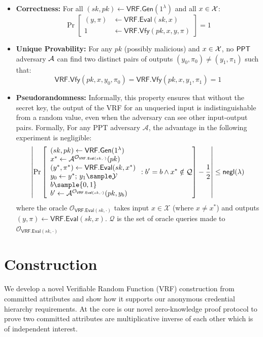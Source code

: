 \begin{itemize}
    \item \textbf{Correctness:} For all $(sk, pk) \gets \mathsf{VRF.Gen}(1^\lambda)$ and all $x \in \mathcal{X}$:
    \[
    \Pr\left[\begin{aligned}
        (y, \pi) &\gets \mathsf{VRF.Eval}(sk, x) \\
        1 &\gets \mathsf{VRF.Vfy}(pk, x, y, \pi)
    \end{aligned}\right] = 1
    \]

    \item \textbf{Unique Provability:} For any $pk$ (possibly malicious) and $x \in \mathcal{X}$, no $\mathsf{PPT}$ adversary $\mathcal{A}$ can find two distinct pairs of outputs $(y_0, \pi_0) \neq (y_1, \pi_1)$ such that:
    \[
    \mathsf{VRF.Vfy}(pk, x, y_0, \pi_0) = \mathsf{VRF.Vfy}(pk, x, y_1, \pi_1) = 1
    \]

    \item \textbf{Pseudorandomness:} Informally, this property ensures that without the secret key, the output of the VRF for an unqueried input is indistinguishable from a random value, even when the adversary can see other input-output pairs.
    Formally, For any PPT adversary $\mathcal{A}$, the advantage in the following experiment is negligible:
    \[
    \left|\Pr\left[\begin{array}{l}
        (sk, pk) \gets \mathsf{VRF.Gen}(1^\lambda) \\
        x^* \gets \mathcal{A}^{\mathcal{O}_{\mathsf{VRF.Eval}(sk, \cdot)}}(pk) \\
        (y^*, \pi^*) \gets \mathsf{VRF.Eval}(sk, x^*) \\
        y_0 \gets y^*; \, y_1 \sample \mathcal{Y} \\
        b \sample \{0,1\} \\
        b' \gets \mathcal{A}^{\mathcal{O}_{\mathsf{VRF.Eval}(sk, \cdot)}}(pk, y_b)
    \end{array} : b' = b \wedge x^* \notin \mathcal{Q}\right] - \frac{1}{2}\right| \leq \negl(\lambda)
    \]
    where the oracle $\mathcal{O}_{\mathsf{VRF.Eval}(sk, \cdot)}$ takes input $x \in \mathcal{X}$ (where $x \neq x^*$) and outputs $(y, \pi) \gets \mathsf{VRF.Eval}(sk, x)$. $\mathcal{Q}$ is the set of oracle queries made to $\mathcal{O}_{\mathsf{VRF.Eval}(sk, \cdot)}$  
\end{itemize}





\section{Construction}
We develop a novel Verifiable Random Function (VRF) construction from committed attributes and show how it supports our anonymous credential hierarchy requirements. At the core is our novel zero-knowledge proof protocol to prove two committed attributes are multiplicative inverse of each other which is of independent interest. 

